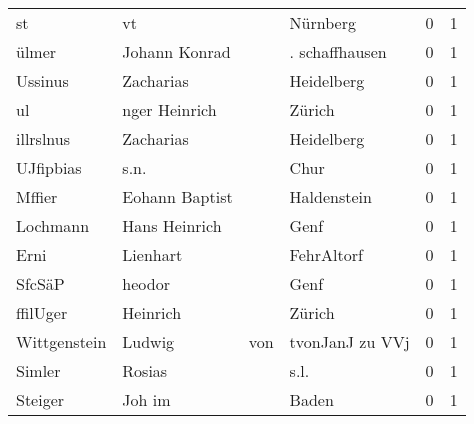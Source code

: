 \begin{center}
\begin{tiny}
\begin{longtabu}{llllrr}
                       st &                                 vt &             &                                    Nürnberg &          0 &         1 \\
                    ülmer &                      Johann Konrad &             &                              . schaffhausen &          0 &         1 \\
                  Ussinus &                          Zacharias &             &                                  Heidelberg &          0 &         1 \\
                       ul &                      nger Heinrich &             &                                      Zürich &          0 &         1 \\
                illrslnus &                          Zacharias &             &                                  Heidelberg &          0 &         1 \\
                UJfipbias &                               s.n. &             &                                        Chur &          0 &         1 \\
                   Mffier &                     Eohann Baptist &             &                                 Haldenstein &          0 &         1 \\
                 Lochmann &                      Hans Heinrich &             &                                        Genf &          0 &         1 \\
                     Erni &                           Lienhart &             &                                  FehrAltorf &          0 &         1 \\
                   SfcSäP &                             heodor &             &                                        Genf &          0 &         1 \\
                 ffilUger &                           Heinrich &             &                                      Zürich &          0 &         1 \\
             Wittgenstein &                             Ludwig &         von &                             tvonJanJ zu VVj &          0 &         1 \\
                   Simler &                             Rosias &             &                                        s.l. &          0 &         1 \\
                  Steiger &                             Joh im &             &                                       Baden &          0 &         1 \\

\end{longtabu}
\end{tiny}
\end{center}
